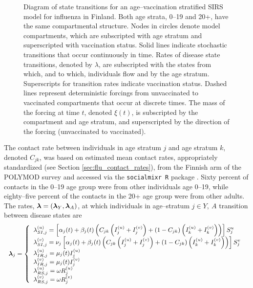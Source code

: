 \begin{figure}[htbp]
	\caption[Diagram of state transitions for an age--vaccination stratified SIRS model for influenza.]{Diagram of state transitions for an age--vaccination stratified SIRS model for influenza in Finland. Both age strata, 0--19 and 20+, have the same compartmental structure. Nodes in circles denote model compartments, which are subscripted with age stratum and superscripted with vaccination status. Solid lines indicate stochastic transitions that occur continuously in time. Rates of disease state transitions, denoted by $ \lambda $, are subscripted with the states from which, and to which, individuals flow and by the age stratum. Superscripts for transition rates indicate vaccination status. Dashed lines represent deterministic forcings from unvaccinated to vaccinated compartments that occur at discrete times. The mass of the forcing at time $ t $, denoted $ \xi(t) $, is subscripted by the compartment and age stratum, and superscripted by the direction of the forcing (unvaccinated to vaccinated).} 
	\label{fig:flu_sirs_diag}
\end{figure}

The contact rate between individuals in age stratum $ j $ and age stratum $ k $, denoted $ C_{jk} $, was based on estimated mean contact rates, appropriately standardized (see Section \ref{sec:flu_contact_rates}), from the Finnish arm of the POLYMOD survey \cite{mossong2008social,polymod} and accessed via the \texttt{socialmixr R} package \cite{funk2018socialmixr}. Sixty percent of contacts in the 0--19 age group were from other individuals age 0--19, while eighty--five percent of the contacts in the 20+ age group were from other adults.  The rates, $ \boldsymbol{\lambda} = (\boldsymbol{\lambda}_{Y},\boldsymbol{\lambda}_{A}) $, at which individuals in age--stratum $ j \in {Y,\ A} $ transition between disease states are
\begin{equation}\small
\label{eqn:flu_sirs_rates}
\boldsymbol{\lambda}_{j} = \left\lbrace
\begin{array}{ll}
\lambda_{SI,j}^{(u)} = \left [\alpha_{j}(t) + \beta_{j}(t)\left (C_{jk}\left (I_{j}^{(u)} + I_{j}^{(v)}\right ) + (1-C_{jk})\left (I_{k}^{(u)} + I_{k}^{(v)}\right )\right )\right ]S_{j}^{u} \\ 
\lambda_{SI,j}^{(v)} = \nu_{j}\left [\alpha_{j}(t) + \beta_{j}(t)\left (C_{jk}\left (I_{j}^{(u)} + I_{j}^{(v)}\right ) + (1-C_{jk})\left (I_{k}^{(u)} + I_{k}^{(v)}\right )\right )\right ]S_{j}^{v}\\
\lambda_{IR,j}^{(u)} = \mu_{j}(t) I_{j}^{(u)} \\
\lambda_{IR,j}^{(v)} = \mu_{j}(t) I_{j}^{(v)} \\
\lambda_{RS,j}^{(u)} = \omega R_{j}^{(u)} \\
\lambda_{RS,j}^{(v)} = \omega R_{j}^{(v)}
\end{array}
\right .
\end{equation}

